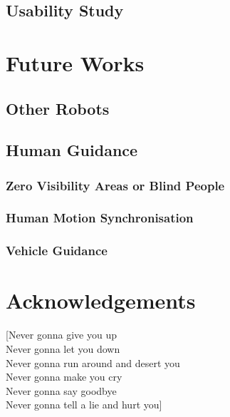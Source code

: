 \documentclass[a4paper, 12pt]{report}
\begin{document}
	\section{Usability Study}

\chapter{Future Works}
	\section{Other Robots}
	\section{Human Guidance}
		\subsection{Zero Visibility Areas or Blind People}
		\subsection{Human Motion Synchronisation}
		\subsection{Vehicle Guidance}

\chapter{Acknowledgements}

[Never gonna give you up\\
Never gonna let you down\\
Never gonna run around and desert you\\
Never gonna make you cry\\
Never gonna say goodbye\\
Never gonna tell a lie and hurt you]

\newpage

\end{document}
